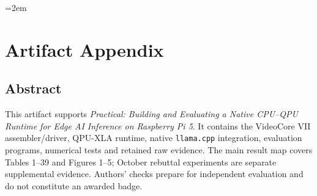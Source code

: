 \begingroup
\emergencystretch=2em\relax
\section{Artifact Appendix}
\label{sec:artifact-appendix}
\label{appx:artifact}
\subsection{Abstract}
This artifact supports \emph{Practical: Building and Evaluating a Native
CPU--QPU Runtime for Edge AI Inference on Raspberry Pi 5}. It contains the
VideoCore VII assembler/driver, QPU-XLA runtime, native \texttt{llama.cpp}
integration, evaluation programs, numerical tests and retained raw evidence.
The main result map covers Tables 1--39 and Figures 1--5; October rebuttal
experiments are separate supplemental evidence. Authors' checks prepare for
independent evaluation and do not constitute an awarded badge.

